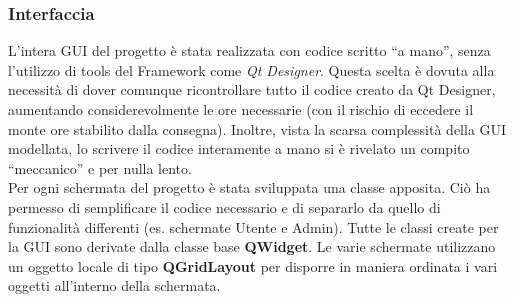 \documentclass[a4paper,10pt] {article}
\begin{document}
\subsubsection{Interfaccia}
L'intera GUI del progetto è stata realizzata con codice scritto ``a mano'', senza l'utilizzo di tools del Framework come \textsl{Qt Designer}.
Questa scelta è dovuta alla necessità di dover comunque ricontrollare tutto il codice creato da Qt Designer, aumentando considerevolmente
le ore necessarie (con il rischio di eccedere il monte ore stabilito dalla consegna). Inoltre, vista la scarsa complessità della GUI modellata, lo scrivere
il codice interamente a mano si è rivelato un compito ``meccanico'' e per nulla lento. \\
Per ogni schermata del progetto è stata sviluppata una classe apposita. Ciò ha permesso di semplificare il codice necessario e di separarlo da quello di funzionalità
differenti (es. schermate Utente e Admin). Tutte le classi create per la GUI sono derivate dalla classe base \textbf{QWidget}. Le varie schermate utilizzano
un oggetto locale di tipo \textbf{QGridLayout} per disporre in maniera ordinata i vari oggetti all'interno della schermata.
\end{document}
